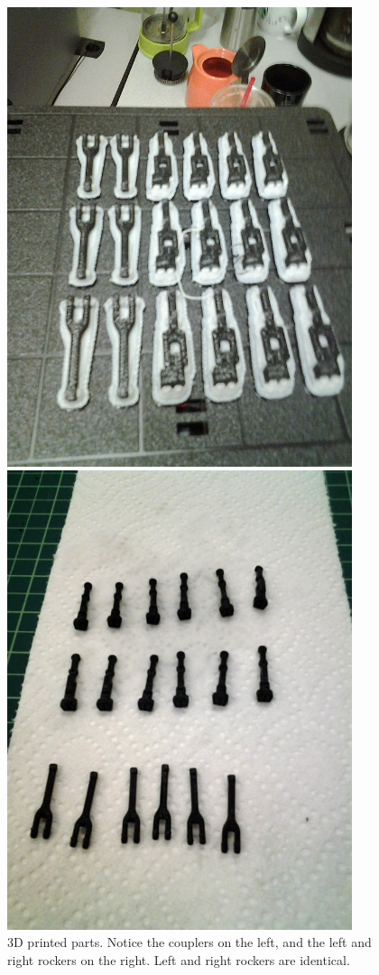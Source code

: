 \begin{figure}
\centering
{}
\includegraphics[width=0.9\textwidth]{Files/Figures/3d_printed_parts_from_printer_small.jpg}
\caption[3D printed parts]{3D printed parts. Notice the couplers on the left, and the left and right rockers on the right. Left and right rockers are identical.}
\label{fig-3d-raw}
\endminipage\hfill
{}
\includegraphics[width=0.9\textwidth]{Files/Figures/3d_printed_cleaned_parts_small.jpg}

\end{figure}
